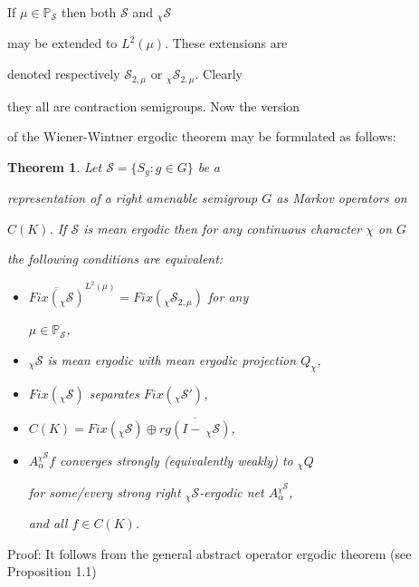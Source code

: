 \documentclass{amsart}
\newtheorem{thm}{Theorem}[section]
\theoremstyle{definition}
\theoremstyle{remark}
\numberwithin{equation}{section}
\begin{document}
If $\mu \in \mathbb{P}_{\mathcal{S}} $ then  both $\mathcal{S}$ and $_{\chi}\mathcal{S}$

may be extended to $L^2(\mu )$. These extensions are

denoted respectively $\mathcal{S}_{2, \mu}$  or $_{\chi}\mathcal{S}_{2,\mu}$. Clearly

they all are contraction semigroups.   Now the version

of the Wiener-Wintner ergodic theorem may be formulated as follows:



\begin{thm}

Let $\mathcal{S} = \{ S_g : g\in G \}$ be a

representation of a right amenable semigroup $G$ as Markov operators on

$C(K)$. If $\mathcal{S}$ is mean ergodic then for any continuous character $\chi $ on $G$

the following conditions are equivalent:

\begin{itemize}

\item[(1)] $\overline{Fix(_{\chi}\mathcal{S})}^{L^2(\mu)} = Fix(_{\chi}\mathcal{S}_{2,\mu})$ for any

$\mu \in \mathbb{P}_{\mathcal{S}}$,

\item[(2)] $_{\chi}\mathcal{S}$ is mean ergodic with mean ergodic projection $Q_{\chi}$,

\item[(3)] $Fix(\mathcal{_{\chi}S})$ separates $Fix(_{\chi}\mathcal{S}')$,

\item[(4)] $C(K) = Fix(_{\chi}\mathcal{S})\oplus \overline{rg(I - \ _{\chi}\mathcal{S})} $,

\item[(5)] $A_{\alpha}^{_{\chi}\mathcal{S}}f$ converges strongly (equivalently weakly) to $_{\chi}Q$

for some/every strong right $_{\chi}\mathcal{S}$-ergodic net $A_{\alpha}^{_{\chi}\mathcal{S}}$,

and all $f\in C(K)$.

\end{itemize}

\end{thm}

Proof: It follows from the general abstract operator ergodic theorem (see Proposition 1.1)
\end{document}
